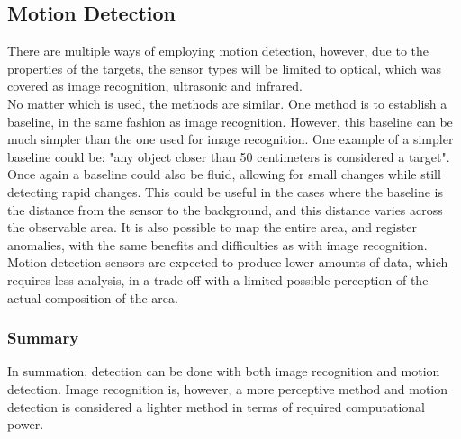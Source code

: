 \subsection{Motion Detection}
There are multiple ways of employing motion detection, however, due to the properties of the targets, the sensor types will be limited to optical, which was covered as image recognition, ultrasonic and infrared. \\ 

No matter which is used, the methods are similar. One method is to establish a baseline, in the same fashion as image recognition. However, this baseline can be much simpler than the one used for image recognition. One example of a simpler baseline could be: "any object closer than 50 centimeters is considered a target". Once again a baseline could also be fluid, allowing for small changes while still detecting rapid changes. This could be useful in the cases where the baseline is the distance from the sensor to the background, and this distance varies across the observable area. It is also possible to map the entire area, and register anomalies, with the same benefits and difficulties as with image recognition. \\

Motion detection sensors are expected to produce lower amounts of data, which requires less analysis, in a trade-off with a limited possible perception of the actual composition of the area.

\subsubsection{Summary}\label{prelsum}
In summation, detection can be done with both image recognition and motion detection. Image recognition is, however, a more perceptive method and motion detection is considered a lighter method in terms of required computational power.

